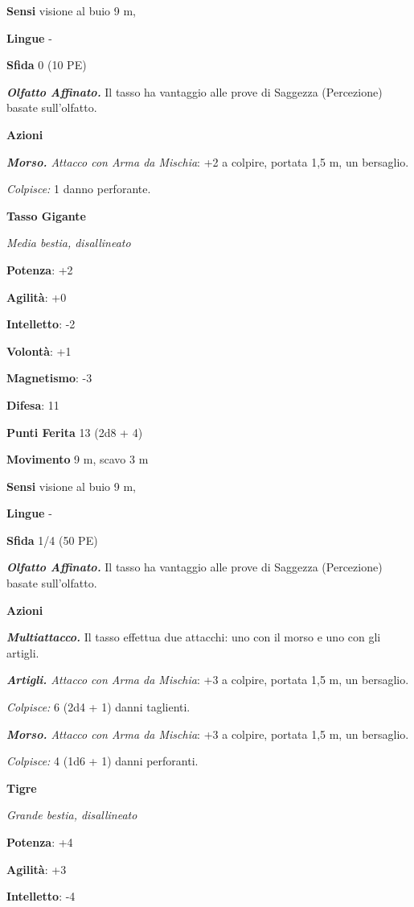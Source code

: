 \begin{multicols}{2}
\textbf{Sensi} visione al buio 9 m, 

\textbf{Lingue} -

\textbf{Sfida} 0 (10 PE)

\emph{\textbf{Olfatto Affinato.}} Il tasso ha vantaggio alle prove di
Saggezza (Percezione) basate sull'olfatto.

\textbf{Azioni}

\emph{\textbf{Morso.} Attacco con Arma da Mischia}: +2 a colpire,
portata 1,5 m, un bersaglio.

\emph{Colpisce:} 1 danno perforante.

\textbf{Tasso Gigante}

\emph{Media bestia, disallineato}

\textbf{Potenza}: +2

\textbf{Agilità}: +0

\textbf{Intelletto}: -2

\textbf{Volontà}: +1

\textbf{Magnetismo}: -3

\textbf{Difesa}: 11

\textbf{Punti Ferita} 13 (2d8 + 4)

\textbf{Movimento} 9 m, scavo 3 m

\textbf{Sensi} visione al buio 9 m, 

\textbf{Lingue} -

\textbf{Sfida} 1/4 (50 PE)

\emph{\textbf{Olfatto Affinato.}} Il tasso ha vantaggio alle prove di
Saggezza (Percezione) basate sull'olfatto.

\textbf{Azioni}

\emph{\textbf{Multiattacco.}} Il tasso effettua due attacchi: uno con il
morso e uno con gli artigli.

\emph{\textbf{Artigli.} Attacco con Arma da Mischia}: +3 a colpire,
portata 1,5 m, un bersaglio.

\emph{Colpisce:} 6 (2d4 + 1) danni taglienti.

\emph{\textbf{Morso.} Attacco con Arma da Mischia}: +3 a colpire,
portata 1,5 m, un bersaglio.

\emph{Colpisce:} 4 (1d6 + 1) danni perforanti.

\textbf{Tigre}

\emph{Grande bestia, disallineato}

\textbf{Potenza}: +4

\textbf{Agilità}: +3

\textbf{Intelletto}: -4


\end{multicols}
